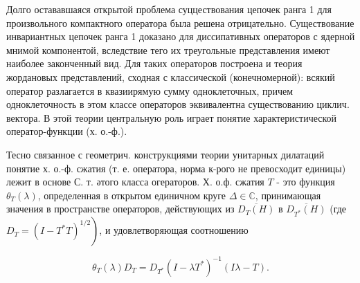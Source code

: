 \documentclass[10pt]{article}
\begin{document}
Долго остававшаяся открытой проблема суццествования цепочек ранга 1 для произвольного компактного оператора была решена отрицательно. Существование инвариантных цепочек ранга 1 доказано для диссипативных операторов с ядерной мнимой компонентой, вследствие тего их треугольные представления имеют наиболее законченный вид. Для таких операторов построена и теория жордановых представлений, сходная с классической (конечномерной): всякий оператор разлагается в квазиирямую сумму одноклеточных, причем одноклеточность в этом классе операторов эквивалентна существованию циклич. вектора. В этой теории центральную роль играет понятие характеристической оператор-функции (х. о.-ф.).



Тесно связанное с геометрич. конструкциями теории унитарных дилатаций понятие х. о.-ф. сжатия (т. е. оператора, норма к-рого не превосходит единицы) лежит в основе С. т. әтого класса огераторов. Х. о.ф. сжатия $T$ - это функция $\theta_{T}(\lambda)$, определенная в открытом единичном круге $\Delta \in \mathbb{C}$, принимающая значения в пространстве операторов, действующих из $\overline{D_{T}(H)}$ в $\overline{D_{T^{*}}(H)}$ (где $\left.D_{T}=\left(I-T^{*} T\right)^{1 / 2}\right)$, и удовлетворяющая соотношению



\[

\theta_{T}(\lambda) D_{T}=D_{T^{*}}\left(I-\lambda T^{*}\right)^{-1}(I \lambda-T) .

\]
\end{document}
